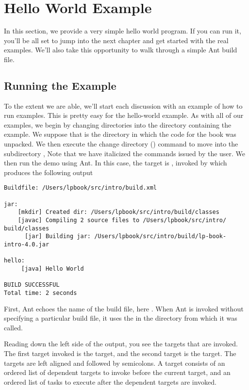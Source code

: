 \section{Hello World Example}

In this section, we provide a very simple hello world program.  If you
can run it, you'll be all set to jump into the next chapter and get
started with the real examples.  We'll also take this opportunity to
walk through a simple Ant build file.

\subsection{Running the Example}

To the extent we are able, we'll start each discussion with an example
of how to run examples.  This is pretty easy for the hello-world
example.  As with all of our examples, we begin by changing
directories into the directory containing the example.  We suppose
that \relpath{} is the directory in which the code for the book was unpacked.
We then execute the change directory () command to move
into the subdirectory ,
%
%
Note that we have italicized the commands issued by the user.
%
We then run the demo using Ant.  In this case, the target is ,
invoked by
%
%
which produces the following output
%
\begin{verbatim}
Buildfile: /Users/lpbook/src/intro/build.xml

jar:
    [mkdir] Created dir: /Users/lpbook/src/intro/build/classes
    [javac] Compiling 2 source files to /Users/lpbook/src/intro/
build/classes
      [jar] Building jar: /Users/lpbook/src/intro/build/lp-book-
intro-4.0.jar

hello:
     [java] Hello World

BUILD SUCCESSFUL
Total time: 2 seconds
\end{verbatim}
%
First, Ant echoes the name of the build file, here
.  When Ant is
invoked without specifying a particular build file, it uses the
 in the directory from which it was called.  

Reading down the left side of the output, you see the targets that are
invoked.  The first target invoked is the  target, and the
second target is the  target.  The targets are left aligned
and followed by semicolons.  A target consists of an ordered list of
dependent targets to invoke before the current target, and an ordered
list of tasks to execute after the dependent targets are invoked.

